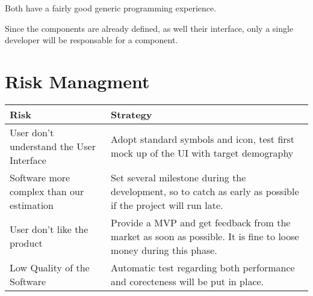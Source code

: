\documentclass[11pt]{article} %
\begin{document}
Both have a fairly good generic programming experience.

Since the components are already defined, as well their interface, only a single developer will be responsable for a component.

\section{Risk Managment}

\begin{table}[h]
\begin{tabularx}{\textwidth}{ | X | X | } \hline
Risk & Strategy \\ \hline \hline
User don't understand the User Interface & Adopt standard symbols and icon, test first mock up of the UI with target demography \\ \hline
Software more complex than our estimation & Set several milestone during the development, so to catch as early as possible if the project will run late. \\ \hline
User don't like the product & Provide a MVP and get feedback from the market as soon as possible. It is fine to loose money during this phase. \\ \hline
Low Quality of the Software & Automatic test regarding both performance and corecteness will be put in place. \\ \hline
\end{tabularx}
\end{table}
\end{document}
